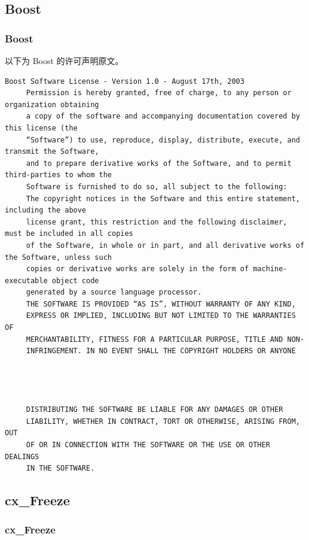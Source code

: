 \subsection{Boost}
\subsubsection*{Boost}

以下为 Boost 的许可声明原文。

\begin{lstlisting}[basicstyle=\ttfamily\footnotesize,breaklines=true]
     Boost Software License - Version 1.0 - August 17th, 2003
     Permission is hereby granted, free of charge, to any person or organization obtaining
     a copy of the software and accompanying documentation covered by this license (the
     “Software”) to use, reproduce, display, distribute, execute, and transmit the Software,
     and to prepare derivative works of the Software, and to permit third-parties to whom the
     Software is furnished to do so, all subject to the following:
     The copyright notices in the Software and this entire statement, including the above
     license grant, this restriction and the following disclaimer, must be included in all copies
     of the Software, in whole or in part, and all derivative works of the Software, unless such
     copies or derivative works are solely in the form of machine-executable object code
     generated by a source language processor.
     THE SOFTWARE IS PROVIDED “AS IS”, WITHOUT WARRANTY OF ANY KIND,
     EXPRESS OR IMPLIED, INCLUDING BUT NOT LIMITED TO THE WARRANTIES OF
     MERCHANTABILITY, FITNESS FOR A PARTICULAR PURPOSE, TITLE AND NON-
     INFRINGEMENT. IN NO EVENT SHALL THE COPYRIGHT HOLDERS OR ANYONE




     DISTRIBUTING THE SOFTWARE BE LIABLE FOR ANY DAMAGES OR OTHER
     LIABILITY, WHETHER IN CONTRACT, TORT OR OTHERWISE, ARISING FROM, OUT
     OF OR IN CONNECTION WITH THE SOFTWARE OR THE USE OR OTHER DEALINGS
     IN THE SOFTWARE.
\end{lstlisting}

\subsection{cx\_Freeze}
\subsubsection*{cx\_Freeze}

